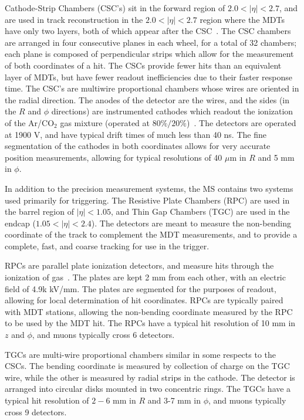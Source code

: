 Cathode-Strip Chambers (CSC's) sit in the forward region of $2.0 < |\eta| < 2.7$, and are used in track reconstruction in the $2.0 < |\eta| < 2.7$ region where the MDTs have only two layers, both of which appear after the CSC~\cite{ATLASPaper}. The CSC chambers are arranged in four consecutive planes in each wheel, for a total of 32 chambers; each plane is composed of perpendicular strips which allow for the measurement of both coordinates of a hit. The CSCs provide fewer hits than an equivalent layer of MDTs, but have fewer readout inefficiencies due to their faster response time. The CSC's are multiwire proportional chambers whose wires are oriented in the radial direction. The anodes of the detector are the wires, and the sides (in the $R$ and $\phi$ directions) are instrumented cathodes which readout the ionization of the Ar/CO$_2$ gas mixture (operated at $80\%/20\%$)~\cite{Detectors,ATLASPaper}. The detectors are operated at 1900 V, and have typical drift times of much less than 40 ns. The fine segmentation of the cathodes in both coordinates allows for very accurate position measurements, allowing for typical resolutions of 40 $\mu$m in $R$ and 5 mm in $\phi$.

In addition to the precision measurement systems, the MS contains two systems used primarily for triggering. The Resistive Plate Chambers (RPC) are used in the barrel region of $|\eta| < 1.05$, and Thin Gap Chambers (TGC) are used in the endcap ($1.05 < |\eta| < 2.4$). The detectors are meant to measure the non-bending coordinate of the track to complement the MDT measurements, and to provide a complete, fast, and coarse tracking for use in the trigger. 

RPCs are parallel plate ionization detectors, and measure hits through the ionization of gas~\cite{Detectors,ATLASPaper}. The plates are kept 2 mm from each other, with an electric field of 4.9k kV/mm. The plates are segmented for the purposes of readout, allowing for local determination of hit coordinates. RPCs are typically paired with MDT stations, allowing the non-bending coordinate measured by the RPC to be used by the MDT hit. The RPCs have a typical hit resolution of 10 mm in $z$ and $\phi$, and muons typically cross 6 detectors. 

TGCs are multi-wire proportional chambers similar in some respects to the CSCs. The bending coordinate is measured by collection of charge on the TGC wire, while the other is measured by radial strips in the cathode. The detector is arranged into circular disks mounted in two concentric rings. The TGCs have a typical hit resolution of $2-6$ mm in $R$ and 3-7 mm in $\phi$, and muons typically cross 9 detectors.

